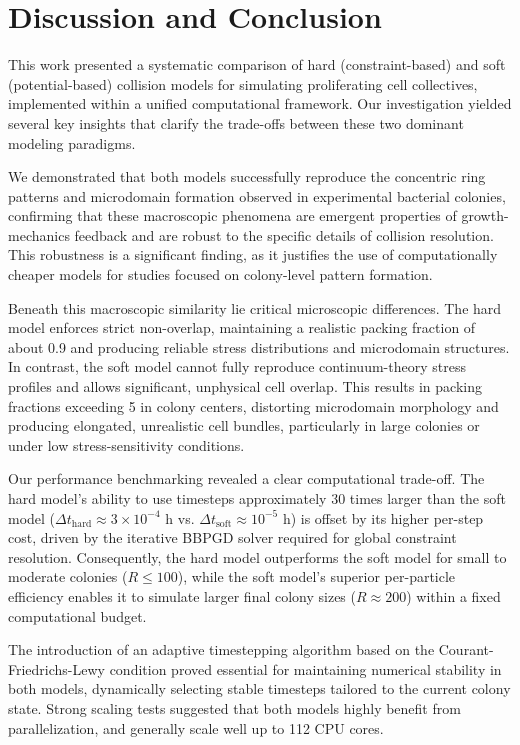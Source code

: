 \documentclass[conference]{IEEEtran}
\begin{document}
\clearpage
\newpage

\section{Discussion and Conclusion}

This work presented a systematic comparison of hard (constraint-based) and soft (potential-based) collision models for simulating proliferating cell collectives, implemented within a unified computational framework. Our investigation yielded several key insights that clarify the trade-offs between these two dominant modeling paradigms.

We demonstrated that both models successfully reproduce the concentric ring patterns and microdomain formation observed in experimental bacterial colonies, confirming that these macroscopic phenomena are emergent properties of growth-mechanics feedback and are robust to the specific details of collision resolution. This robustness is a significant finding, as it justifies the use of computationally cheaper models for studies focused on colony-level pattern formation.

Beneath this macroscopic similarity lie critical microscopic differences. The hard model enforces strict non-overlap, maintaining a realistic packing fraction of about 0.9 and producing reliable stress distributions and microdomain structures. In contrast, the soft model cannot fully reproduce continuum-theory stress profiles and allows significant, unphysical cell overlap. This results in packing fractions exceeding 5 in colony centers, distorting microdomain morphology and producing elongated, unrealistic cell bundles, particularly in large colonies or under low stress-sensitivity conditions.

Our performance benchmarking revealed a clear computational trade-off. The hard model's ability to use timesteps approximately 30 times larger than the soft model ($\Delta t_{\text{hard}} \approx 3 \times 10^{-4}$ h vs. $\Delta t_{\text{soft}} \approx 10^{-5}$ h) is offset by its higher per-step cost, driven by the iterative BBPGD solver required for global constraint resolution. Consequently, the hard model outperforms the soft model for small to moderate colonies ($R \leq 100$), while the soft model's superior per-particle efficiency enables it to simulate larger final colony sizes ($R \approx 200$) within a fixed computational budget.

The introduction of an adaptive timestepping algorithm based on the Courant-Friedrichs-Lewy condition proved essential for maintaining numerical stability in both models, dynamically selecting stable timesteps tailored to the current colony state. Strong scaling tests suggested that both models highly benefit from parallelization, and generally scale well up to 112 CPU cores.
\end{document}
